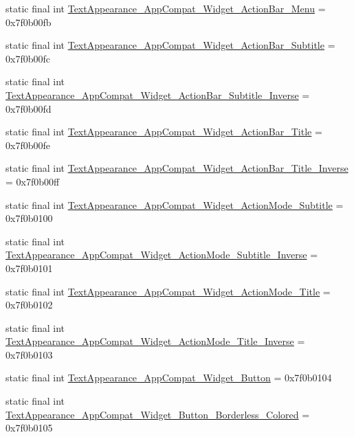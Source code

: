 \begin{CompactItemize}
\item 
static final int \hyperlink{classandroid_1_1support_1_1v4_1_1_r_1_1style_9739ce1bd0bae8a49a8cd01dea961ae3}{TextAppearance\_\-AppCompat\_\-Widget\_\-ActionBar\_\-Menu} = 0x7f0b00fb
\item 
static final int \hyperlink{classandroid_1_1support_1_1v4_1_1_r_1_1style_a9bb52c7189759b7089b93076278cc89}{TextAppearance\_\-AppCompat\_\-Widget\_\-ActionBar\_\-Subtitle} = 0x7f0b00fc
\item 
static final int \hyperlink{classandroid_1_1support_1_1v4_1_1_r_1_1style_3031ab26a10a4bafe2d964269cd592c0}{TextAppearance\_\-AppCompat\_\-Widget\_\-ActionBar\_\-Subtitle\_\-Inverse} = 0x7f0b00fd
\item 
static final int \hyperlink{classandroid_1_1support_1_1v4_1_1_r_1_1style_a7dcb1753ea4240154dcdb03d6bcfc5e}{TextAppearance\_\-AppCompat\_\-Widget\_\-ActionBar\_\-Title} = 0x7f0b00fe
\item 
static final int \hyperlink{classandroid_1_1support_1_1v4_1_1_r_1_1style_cef73b99b9fc925c8721ad84e0fcdbe9}{TextAppearance\_\-AppCompat\_\-Widget\_\-ActionBar\_\-Title\_\-Inverse} = 0x7f0b00ff
\item 
static final int \hyperlink{classandroid_1_1support_1_1v4_1_1_r_1_1style_a8f2fc4e8e05daff8a91163df55b8e78}{TextAppearance\_\-AppCompat\_\-Widget\_\-ActionMode\_\-Subtitle} = 0x7f0b0100
\item 
static final int \hyperlink{classandroid_1_1support_1_1v4_1_1_r_1_1style_8a8527898fe6472f681f22223e565cd2}{TextAppearance\_\-AppCompat\_\-Widget\_\-ActionMode\_\-Subtitle\_\-Inverse} = 0x7f0b0101
\item 
static final int \hyperlink{classandroid_1_1support_1_1v4_1_1_r_1_1style_86232bb59573b477b6e8b952410563e3}{TextAppearance\_\-AppCompat\_\-Widget\_\-ActionMode\_\-Title} = 0x7f0b0102
\item 
static final int \hyperlink{classandroid_1_1support_1_1v4_1_1_r_1_1style_358fa57a38c2eb1c42fb22fd7f52c5a9}{TextAppearance\_\-AppCompat\_\-Widget\_\-ActionMode\_\-Title\_\-Inverse} = 0x7f0b0103
\item 
static final int \hyperlink{classandroid_1_1support_1_1v4_1_1_r_1_1style_88b5e25c076c8972c206b2576ed6a08b}{TextAppearance\_\-AppCompat\_\-Widget\_\-Button} = 0x7f0b0104
\item 
static final int \hyperlink{classandroid_1_1support_1_1v4_1_1_r_1_1style_a5595371f2cc6a0b624b5e3b4f11a014}{TextAppearance\_\-AppCompat\_\-Widget\_\-Button\_\-Borderless\_\-Colored} = 0x7f0b0105
\item 

\end{CompactItemize}
